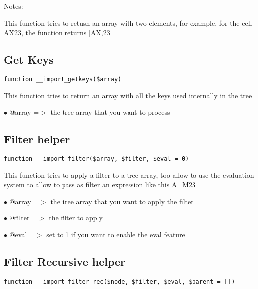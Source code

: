 \documentclass[a4paper]{book}
\begin{document}
Notes:

This function tries to retusn an array with two elements, for example, for
the cell AX23, the function returns [AX,23]

\hypertarget{toc181}{}
\subsection{Get Keys}

\begin{lstlisting}
function __import_getkeys($array)
\end{lstlisting}

This function tries to return an array with all the keys used internally
in the tree

\begin{compactitem}
\item[\color{myblue}$\bullet$] @array =$>$ the tree array that you want to process
\end{compactitem}

\hypertarget{toc182}{}
\subsection{Filter helper}

\begin{lstlisting}
function __import_filter($array, $filter, $eval = 0)
\end{lstlisting}

This function tries to apply a filter to a tree array, too allow to use
the evaluation system to allow to pass as filter an expression like this
A=M23

\begin{compactitem}
\item[\color{myblue}$\bullet$] @array  =$>$ the tree array that you want to apply the filter
\item[\color{myblue}$\bullet$] @filter =$>$ the filter to apply
\item[\color{myblue}$\bullet$] @eval   =$>$ set to 1 if you want to enable the eval feature
\end{compactitem}

\hypertarget{toc183}{}
\subsection{Filter Recursive helper}

\begin{lstlisting}
function __import_filter_rec($node, $filter, $eval, $parent = [])
\end{lstlisting}
\end{document}
